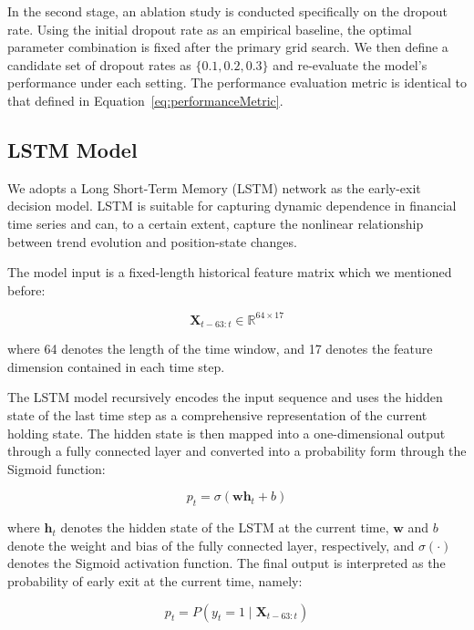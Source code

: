 \documentclass[12pt]{article}
\begin{document}
In the second stage, an ablation study is conducted specifically on the dropout rate. Using the initial dropout rate as an empirical baseline, the optimal parameter combination is fixed after the primary grid search. We then define a candidate set of dropout rates as $\{0.1, 0.2, 0.3\}$ and re-evaluate the model's performance under each setting. The performance evaluation metric is identical to that defined in Equation~\ref{eq:performanceMetric}.

\subsection{LSTM Model}

We adopts a Long Short-Term Memory (LSTM) network as the early-exit decision model. LSTM is suitable for capturing dynamic dependence in financial time series and can, to a certain extent, capture the nonlinear relationship between trend evolution and position-state changes.

The model input is a fixed-length historical feature matrix which we mentioned before:

\begin{equation}
    \mathbf{X}_{t-63:t} \in \mathbb{R}^{64 \times 17}
\end{equation}

where 64 denotes the length of the time window, and 17 denotes the feature dimension contained in each time step.

The LSTM model recursively encodes the input sequence and uses the hidden state of the last time step as a comprehensive representation of the current holding state. The hidden state is then mapped into a one-dimensional output through a fully connected layer and converted into a probability form through the Sigmoid function:

\begin{equation}
    p_t = \sigma(\mathbf{w}\mathbf{h}_t + b)
\end{equation}

where $\mathbf{h}_t$ denotes the hidden state of the LSTM at the current time, $\mathbf{w}$ and $b$ denote the weight and bias of the fully connected layer, respectively, and $\sigma(\cdot)$ denotes the Sigmoid activation function. The final output is interpreted as the probability of early exit at the current time, namely:

\begin{equation}
    p_t = P(y_t = 1 \mid \mathbf{X}_{t-63:t})
\end{equation}
\end{document}
